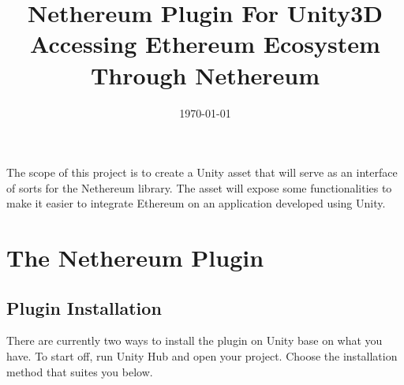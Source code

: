 \documentclass[a4paper, 11pt, titlepage]{article}
\date{\today}
\title{Nethereum Plugin For Unity3D\\\medskip
\large Accessing Ethereum Ecosystem Through Nethereum}
\begin{document}
\maketitle
The scope of this project is to create a Unity asset that will serve as an interface of sorts for the Nethereum library. The asset will expose some functionalities to make it easier to integrate Ethereum on an application developed using Unity.

\section{The Nethereum Plugin}
\label{sec:orga4e7dc9}
\subsection{Plugin Installation}
\label{sec:org54db642}

There are currently two ways to install the plugin on Unity base on what you have. To start off, run Unity Hub and open your project. Choose the installation method that suites you below.
\end{document}
